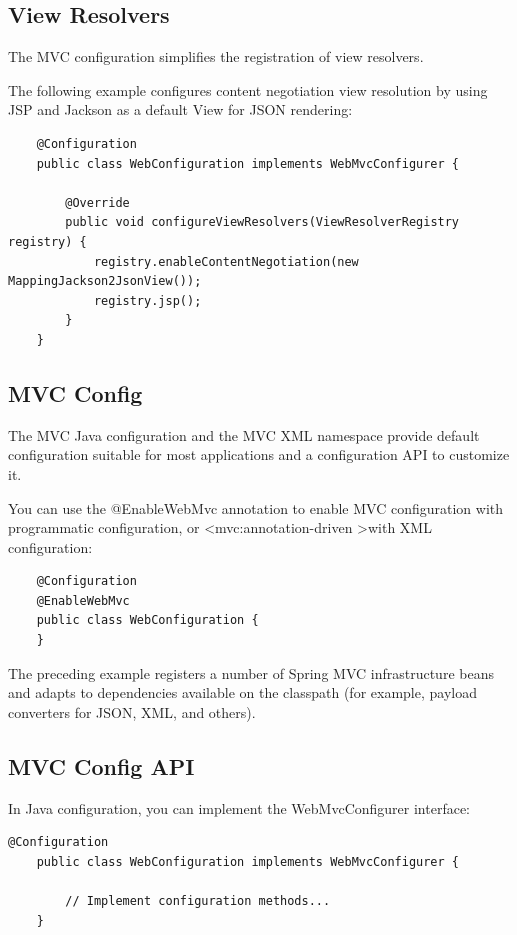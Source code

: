 \documentclass{scrartcl}
\begin{document}
\subsection{View Resolvers}

The MVC configuration simplifies the registration of view resolvers.

The following example configures content negotiation view resolution by using JSP and Jackson as a default View for JSON rendering:

\begin{lstlisting}
    @Configuration
    public class WebConfiguration implements WebMvcConfigurer {

        @Override
        public void configureViewResolvers(ViewResolverRegistry registry) {
            registry.enableContentNegotiation(new MappingJackson2JsonView());
            registry.jsp();
        }
    }
\end{lstlisting}


\subsection{MVC Config}

The MVC Java configuration and the MVC XML namespace provide default configuration suitable for most applications and a configuration API to customize it.

You can use the @EnableWebMvc annotation to enable MVC configuration with programmatic configuration, or \textless mvc:annotation-driven \textgreater  with XML configuration:

\begin{lstlisting}
    @Configuration
    @EnableWebMvc
    public class WebConfiguration {
    }
\end{lstlisting}

The preceding example registers a number of Spring MVC infrastructure beans and adapts to dependencies available on the classpath (for example, payload converters for JSON, XML, and others).

\subsection{MVC Config API}

In Java configuration, you can implement the WebMvcConfigurer interface:

\begin{lstlisting}@Configuration
    public class WebConfiguration implements WebMvcConfigurer {

        // Implement configuration methods...
    }
\end{lstlisting}
\end{document}
